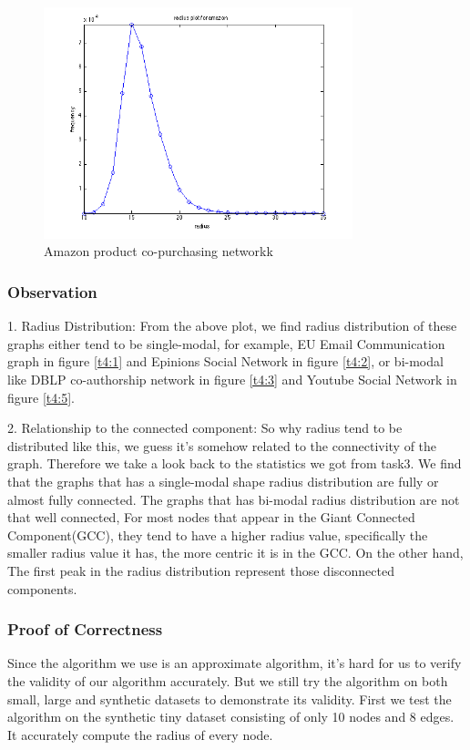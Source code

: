 \begin{figure}[!htbf]
\begin{center}
     \includegraphics[width=0.8\textwidth]{FIG/t4_amazon.png} 
\caption{Amazon product co-purchasing networkk}
\label{t4:6}
\end{center}
\end{figure}


 
\subsubsection{Observation}
1. Radius Distribution: From the above plot, we find radius distribution of these graphs either tend to be single-modal, for example, EU Email Communication graph in figure \ref{t4:1} and Epinions Social Network in figure \ref {t4:2}, or bi-modal like DBLP co-authorship network in figure \ref{t4:3} and Youtube Social Network in figure \ref{t4:5}.

2. Relationship to the connected component: So why radius tend to be distributed like this, we guess it's somehow related to the connectivity of the graph. Therefore we take a look back to the statistics we got from task3. We find that the graphs that has a single-modal shape radius distribution are fully or almost fully connected. The graphs that has bi-modal radius distribution are not that well connected, For most nodes that appear in the Giant Connected Component(GCC), they tend to have a higher radius value, specifically the smaller radius value it has, the more centric it is in the GCC. On the other hand, The first peak in the radius distribution represent those disconnected components.

\subsubsection{Proof of Correctness}
Since the algorithm we use is an approximate algorithm, it's hard for us to verify the validity of our algorithm accurately. But we still try the algorithm on both small, large and synthetic datasets to demonstrate its validity.  
First we test the algorithm on the synthetic tiny dataset consisting of only 10 nodes and 8 edges. It accurately compute the radius of every node.
 
